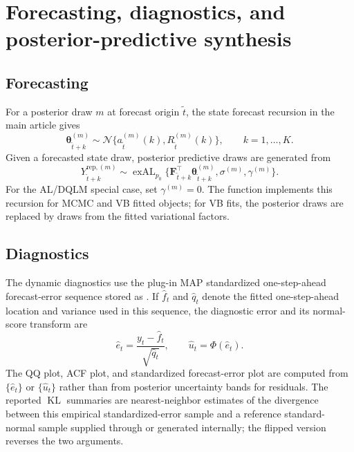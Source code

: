 \documentclass[nojss,noheadings]{jss}
\newcommand{\vect}[1]{\bm{#1}}
\newcommand{\mat}[1]{\mathbf{#1}}
\newcommand{\N}{\mathcal{N}}
\newcommand{\exAL}{\operatorname{exAL}}
\newcommand{\KL}{\operatorname{KL}}
\begin{document}
\section{Forecasting, diagnostics, and posterior-predictive synthesis}
\label{sec:forecast_diagnostics_synthesis}

\subsection{Forecasting}

For a posterior draw $m$ at forecast origin $\tilde t$, the state forecast
recursion in the main article gives
\begin{equation}
\vect{\theta}_{\tilde t+k}^{(m)}
\sim
\N\{a_{\tilde t}^{(m)}(k),R_{\tilde t}^{(m)}(k)\},
\qquad k=1,\ldots,K.
\end{equation}
Given a forecasted state draw, posterior predictive draws are generated from
\begin{equation}
Y_{\tilde t+k}^{\mathrm{rep},(m)}
\sim
\exAL_{p_0}\{
\mat{F}_{\tilde t+k}^\top\vect{\theta}_{\tilde t+k}^{(m)},
\sigma^{(m)},\gamma^{(m)}
\}.
\label{eq:forecast_postpred}
\end{equation}
For the AL/DQLM special case, set $\gamma^{(m)}=0$. The function
 implements this recursion for MCMC and VB fitted
objects; for VB fits, the posterior draws are replaced by draws from the fitted
variational factors.

\subsection{Diagnostics}

The dynamic diagnostics use the plug-in MAP standardized one-step-ahead
forecast-error sequence stored as . If
$\widehat f_t$ and $\widehat q_t$ denote the fitted one-step-ahead location and
variance used in this sequence, the diagnostic error and its normal-score
transform are
\begin{equation}
\widehat e_t = \frac{y_t-\widehat f_t}{\sqrt{\widehat q_t}},
\qquad
\widehat u_t = \Phi(\widehat e_t).
\label{eq:pit_plugin}
\end{equation}
The QQ plot, ACF plot, and standardized forecast-error plot are computed from
$\{\widehat e_t\}$ or $\{\widehat u_t\}$ rather than from posterior uncertainty
bands for residuals. The reported $\KL$ summaries are nearest-neighbor estimates
of the divergence between this empirical standardized-error sample and a
reference standard-normal sample supplied through  or generated
internally; the flipped version reverses the two arguments.
\end{document}
